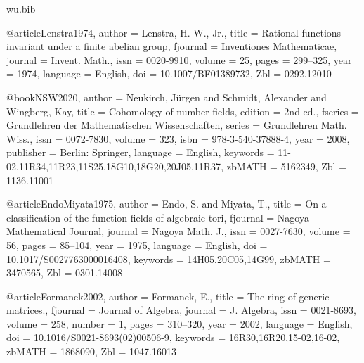 \documentclass[12pt,a4paper]{article}
\theoremstyle{definition}
\begin{document}
\begin{filecontents}{wu.bib}

@article{Lenstra1974,
    author = {Lenstra, H. W., Jr.},
    title = {Rational functions invariant under a finite abelian group},
    fjournal = {Inventiones Mathematicae},
    journal = {Invent. Math.},
    issn = {0020-9910},
    volume = {25},
    pages = {299--325},
    year = {1974},
    language = {English},
    doi = {10.1007/BF01389732},
    Zbl = {0292.12010}
}

@book{NSW2020,
    author = {Neukirch, J{\"u}rgen and Schmidt, Alexander and Wingberg, Kay},
    title = {Cohomology of number fields},
    edition = {2nd ed.},
    fseries = {Grundlehren der Mathematischen Wissenschaften},
    series = {Grundlehren Math. Wiss.},
    issn = {0072-7830},
    volume = {323},
    isbn = {978-3-540-37888-4},
    year = {2008},
    publisher = {Berlin: Springer},
    language = {English},
    keywords = {11-02,11R34,11R23,11S25,18G10,18G20,20J05,11R37},
    zbMATH = {5162349},
    Zbl = {1136.11001}
}


@article{EndoMiyata1975,
	author = {Endo, S. and Miyata, T.},
	title = {On a classification of the function fields of algebraic tori},
	fjournal = {Nagoya Mathematical Journal},
	journal = {Nagoya Math. J.},
	issn = {0027-7630},
	volume = {56},
	pages = {85--104},
	year = {1975},
	language = {English},
	doi = {10.1017/S0027763000016408},
	keywords = {14H05,20C05,14G99},
	zbMATH = {3470565},
	Zbl = {0301.14008}
}

@article{Formanek2002,
	author = {Formanek, E.},
	title = {The ring of generic matrices.},
	fjournal = {Journal of Algebra},
	journal = {J. Algebra},
	issn = {0021-8693},
	volume = {258},
	number = {1},
	pages = {310--320},
	year = {2002},
	language = {English},
	doi = {10.1016/S0021-8693(02)00506-9},
	keywords = {16R30,16R20,15-02,16-02},
	zbMATH = {1868090},
	Zbl = {1047.16013}
}	


\end{filecontents}
\end{document}
